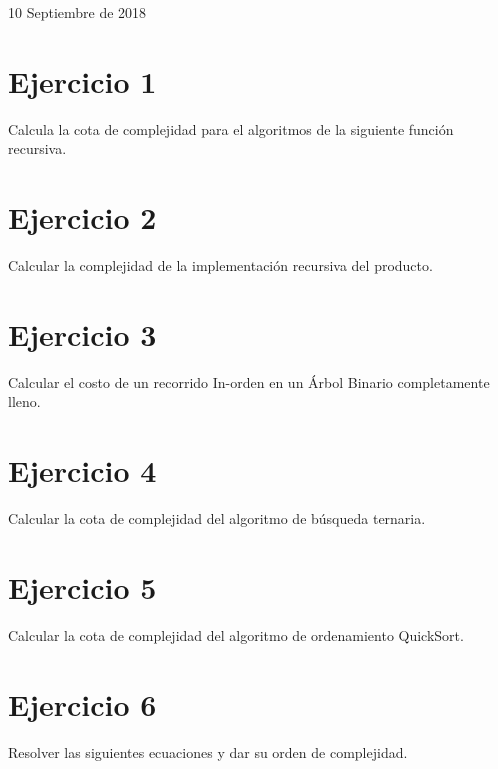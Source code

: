 \documentclass[12pt]{article}
\begin{document}
\begin{titlepage}
\begin{center}
				{\large 10 Septiembre de 2018}
			\end{center}
		\end{titlepage}
	\tableofcontents
  \newpage

  \section{Ejercicio 1}
    Calcula la cota de complejidad para el algoritmos de la siguiente función recursiva.


  \section{Ejercicio 2}
    Calcular la complejidad de la implementación recursiva del producto.


  \section{Ejercicio 3}
    Calcular el costo de un recorrido In-orden en un Árbol Binario completamente lleno.

  \section{Ejercicio 4}
    Calcular la cota de complejidad del algoritmo de búsqueda ternaria.


  \section{Ejercicio 5}
    Calcular la cota de complejidad del algoritmo de ordenamiento QuickSort.

  \section{Ejercicio 6}
    Resolver las siguientes ecuaciones y dar su orden de complejidad.
\end{document}
